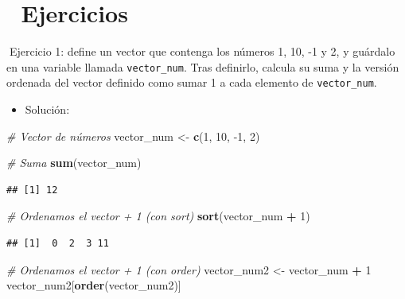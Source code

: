 \documentclass[11pt,]{book}
\newenvironment{Shaded}{\begin{snugshade}}{\end{snugshade}}
\newcommand{\CommentTok}[1]{\textcolor[rgb]{0.37,0.37,0.37}{\textit{#1}}}
\newcommand{\DecValTok}[1]{\textcolor[rgb]{0.06,0.06,0.06}{#1}}
\newcommand{\KeywordTok}[1]{\textcolor[rgb]{0.27,0.27,0.27}{\textbf{#1}}}
\newcommand{\NormalTok}[1]{#1}
\newcommand{\OperatorTok}[1]{\textcolor[rgb]{0.43,0.43,0.43}{\textbf{#1}}}
\newcommand{\StringTok}[1]{\textcolor[rgb]{0.5,0.5,0.5}{#1}}
\providecommand{\tightlist}{%
  \setlength{\itemsep}{0pt}\setlength{\parskip}{0pt}}
\begin{document}
\hypertarget{ejercicios}{%
\section{📝 Ejercicios}\label{ejercicios}}

📝Ejercicio 1: define un vector que contenga los números 1, 10, -1 y 2, y guárdalo en una variable llamada \texttt{vector\_num}. Tras definirlo, calcula su suma y la versión ordenada del vector definido como sumar 1 a cada elemento de \texttt{vector\_num}.

\begin{itemize}
\tightlist
\item
  Solución:
\end{itemize}

\begin{Shaded}
\begin{Highlighting}[]
\CommentTok{# Vector de números}
\NormalTok{vector_num <-}\StringTok{ }\KeywordTok{c}\NormalTok{(}\DecValTok{1}\NormalTok{, }\DecValTok{10}\NormalTok{, }\DecValTok{-1}\NormalTok{, }\DecValTok{2}\NormalTok{)}

\CommentTok{# Suma}
\KeywordTok{sum}\NormalTok{(vector_num)}
\end{Highlighting}
\end{Shaded}

\begin{verbatim}
## [1] 12
\end{verbatim}

\begin{Shaded}
\begin{Highlighting}[]
\CommentTok{# Ordenamos el vector + 1 (con sort)}
\KeywordTok{sort}\NormalTok{(vector_num }\OperatorTok{+}\StringTok{ }\DecValTok{1}\NormalTok{)}
\end{Highlighting}
\end{Shaded}

\begin{verbatim}
## [1]  0  2  3 11
\end{verbatim}

\begin{Shaded}
\begin{Highlighting}[]
\CommentTok{# Ordenamos el vector + 1 (con order)}
\NormalTok{vector_num2 <-}\StringTok{ }\NormalTok{vector_num }\OperatorTok{+}\StringTok{ }\DecValTok{1}
\NormalTok{vector_num2[}\KeywordTok{order}\NormalTok{(vector_num2)]}
\end{Highlighting}
\end{Shaded}
\end{document}
